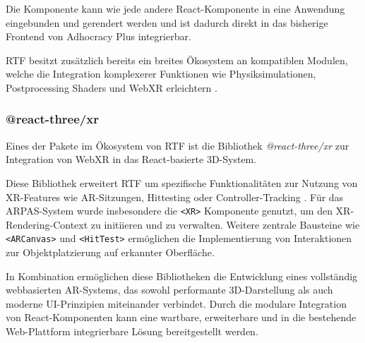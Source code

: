 Die Komponente kann wie jede andere React-Komponente in eine Anwendung eingebunden und gerendert werden und ist dadurch direkt in das bisherige Frontend von Adhocracy Plus integrierbar.

\medskip

RTF besitzt zusätzlich bereits ein breites Ökosystem an kompatiblen Modulen, welche die Integration komplexerer Funktionen wie Physiksimulationen, Postprocessing Shaders und WebXR erleichtern \parencite{poimandresReactThreeEcosystem2025}.

\subsubsection{@react-three/xr}

Eines der Pakete im Ökosystem von RTF ist die Bibliothek \textit{@react-three/xr} zur Integration von WebXR in das React-basierte 3D-System.

Diese Bibliothek erweitert RTF um spezifische Funktionalitäten zur Nutzung von XR-Features wie AR-Sitzungen, Hittesting oder Controller-Tracking \parencite{poimandresPmndrsReactxr2024}. Für das ARPAS-System wurde insbesondere die \texttt{<XR>} Komponente genutzt, um den XR-Rendering-Context zu initiieren und zu verwalten. Weitere zentrale Bausteine wie \texttt{<ARCanvas>} und \texttt{<HitTest>} ermöglichen die Implementierung von Interaktionen zur Objektplatzierung auf erkannter Oberfläche.

\medskip

In Kombination ermöglichen diese Bibliotheken die Entwicklung eines vollständig webbasierten AR-Systems, das sowohl performante 3D-Darstellung als auch moderne UI-Prinzipien miteinander verbindet. Durch die modulare Integration von React-Komponenten kann eine wartbare, erweiterbare und in die bestehende Web-Plattform integrierbare Lösung bereitgestellt werden.
